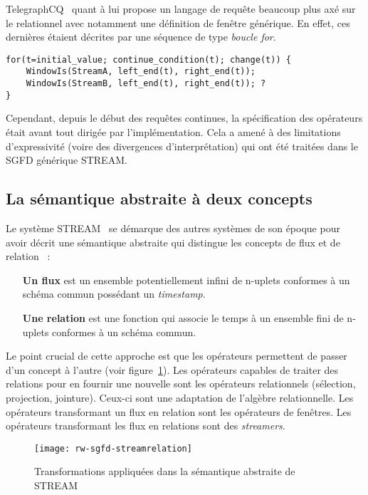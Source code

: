 TelegraphCQ~\cite{Chandrasekaran:telegraphcq} quant à lui propose un langage de requête beaucoup plus axé sur le relationnel avec notamment une définition de fenêtre générique. En effet, ces dernières étaient décrites par une séquence de type \textit{boucle for}.
\begin{center}
\begin{minipage}[c]{0.75\textwidth}
\begin{verbatim}
for(t=initial_value; continue_condition(t); change(t)) {
    WindowIs(StreamA, left_end(t), right_end(t));
    WindowIs(StreamB, left_end(t), right_end(t)); ?
}
\end{verbatim}
\end{minipage}
\end{center}

Cependant, depuis le début des requêtes continues, la spécification des opérateurs était avant tout dirigée par l'implémentation. Cela a amené à des limitations d'expressivité (voire des divergences d'interprétation) qui ont été traitées dans le SGFD générique STREAM.

\subsection{La sémantique abstraite à deux concepts}\label{sec:rw:sgfd:modeles:stream}
Le système STREAM~\cite{Widom:queries, Arasu:stream} se démarque des autres systèmes de son époque pour avoir décrit une sémantique abstraite qui distingue les concepts de flux et de relation~\cite{Arasu:semantic} :
\begin{itemize}
 \item[\textbf{Un flux}] est un ensemble potentiellement infini de n-uplets conformes à un schéma commun possédant un \textit{timestamp}.
 \item[\textbf{Une relation}] est une fonction qui associe le temps à un ensemble fini de n-uplets conformes à un schéma commun.
\end{itemize}
Le point crucial de cette approche est que les opérateurs permettent de passer d'un concept à l'autre (voir figure~\ref{fig:rw:sgfd:streamrelation}). Les opérateurs capables de traiter des relations pour en fournir une nouvelle sont les opérateurs relationnels (sélection, projection, jointure). Ceux-ci sont une adaptation de l'algèbre relationnelle. Les opérateurs transformant un flux en relation sont les opérateurs de fenêtres. Les opérateurs transformant les flux en relations sont des \textit{streamers}.
\begin{figure}[ht]
    \centering
    \texttt{[image: rw-sgfd-streamrelation]}
    \caption{Transformations appliquées dans la sémantique abstraite de STREAM}\label{fig:rw:sgfd:streamrelation}
\end{figure}

